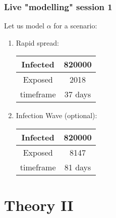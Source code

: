 \documentclass{beamer}
\begin{document}
\begin{frame}
\frametitle{Live "modelling" session 1} 
	Let us model $\alpha$ for a scenario:\\\vspace{0.3cm}
	\begin{enumerate}

		\item Rapid spread:\\\vspace{0.1cm}
			\begin{tabular}{| c | c |}
				\hline
				Infected & 820000 \\
				\hline
				Exposed & 2018 \\
				\hline
				timeframe & 37 days \\
				\hline
			\end{tabular}
			\vspace{0.3cm}
		
		\item Infection Wave (optional):\\\vspace{0.1cm}
			\begin{tabular}{| c | c |}
				\hline
				Infected & 820000 \\
				\hline
				Exposed & 8147 \\
				\hline
				timeframe & 81 days \\
				\hline
			\end{tabular} \vspace{0.5cm}
	\end{enumerate}
\end{frame}

\section{Theory II}
\end{document}

